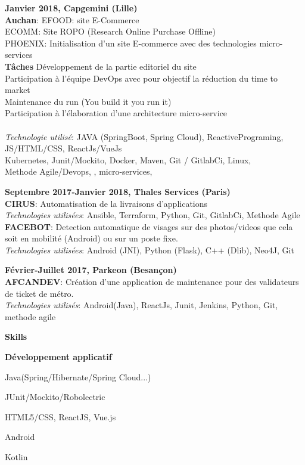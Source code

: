\documentclass[a4paper,11pt,final]{memoir}
\newcommand\tab[1][1,8cm]{\hspace*{#1}}
\newcommand{\CVSection}[1]
	{\Large\textbf{#1}\par
	\normalsize\normalfont}
\newcommand{\CVItem}[1]
	{\textbf{\color{RoyalBlue} #1}}
\begin{document}
\CVItem{Janvier 2018, Capgemini (Lille) }\\
\textbf{Auchan}: EFOOD: site E-Commerce\\
\tab ECOMM: Site ROPO (Research Online Purchase Offline)\\
\tab PHOENIX:  Initialisation d'un site E-commerce avec des technologies micro-services\\
\textbf{Tâches  }   \textbullet  Développement de la partie editoriel du site \\
\tab \textbullet  Participation à l'équipe DevOps avec pour objectif la réduction du time to market \\
\tab \textbullet Maintenance du run (You build it you run it) \\
\tab \textbullet Participation à l'élaboration d'une architecture micro-service  \\
\\
 \textit{Technologie utilisé}: JAVA (SpringBoot, Spring Cloud), ReactivePrograming, JS/HTML/CSS, ReactJs/VueJs  \\
Kubernetes, Junit/Mockito, Docker, Maven, Git / GitlabCi, Linux, \\
Methode Agile/Devops, , micro-services, 


\CVItem{Septembre 2017-Janvier 2018, Thales Services (Paris) }\\
\textbf{CIRUS}: Automatisation de la livraisons d'applications\\
 \textit{Technologies utilisées}: Ansible, Terraform, Python, Git, GitlabCi, Methode Agile \\
 \textbf{FACEBOT}: Detection automatique de visages sur des photos/videos que cela soit en mobilité (Android) ou sur un poste fixe.\\
 \textit{Technologies utilisées}: Android (JNI), Python (Flask), C++ (Dlib), Neo4J, Git 


\CVItem{Février-Juillet 2017, Parkeon (Besançon)}\\
\textbf{AFCANDEV}: Création d’une application de maintenance pour des validateurs de ticket de métro. \\
 \textit{Technologies utilisés}: Android(Java), ReactJs, Junit, Jenkins, Python, Git, methode agile


\CVSection{Skills}
\CVItem{Développement applicatif}
\begin{multicols}{2}
\begin{compactitem}[\color{RoyalBlue}$\circ$]
	\item Java(Spring/Hibernate/Spring Cloud...)
	\item JUnit/Mockito/Robolectric
	\item HTML5/CSS, ReactJS, Vue.js
	\item Android
	\item Kotlin 
\end{compactitem}
\end{multicols}
\end{document}

